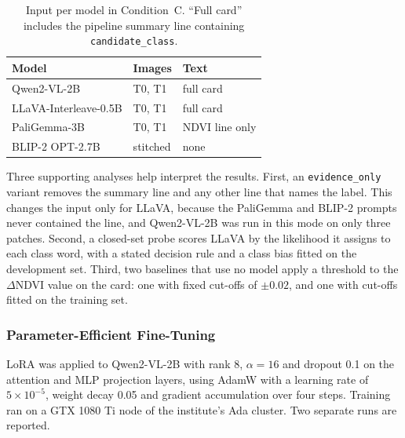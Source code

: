 \begin{table}[t]
\centering
\small
\begin{tabular}{lll}
\toprule
Model & Images & Text \\
\midrule
Qwen2-VL-2B & T0, T1 & full card \\
LLaVA-Interleave-0.5B & T0, T1 & full card \\
PaliGemma-3B & T0, T1 & NDVI line only \\
BLIP-2 OPT-2.7B & stitched & none \\
\bottomrule
\end{tabular}
\caption{Input per model in Condition~C. ``Full card'' includes the
pipeline summary line containing \texttt{candidate\_class}.}
\label{tab:inputs}
\end{table}

Three supporting analyses help interpret the results. First, an
\texttt{evidence\_only} variant removes the summary line and any other
line that names the label. This changes the input only for LLaVA,
because the PaliGemma and BLIP-2 prompts never contained the line, and
Qwen2-VL-2B was run in this mode on only three patches. Second, a
closed-set probe scores LLaVA by the likelihood it assigns to each class
word, with a stated decision rule and a class bias fitted on the
development set. Third, two baselines that use no model apply a
threshold to the $\Delta$NDVI value on the card: one with fixed cut-offs
of $\pm 0.02$, and one with cut-offs fitted on the training set.

\subsubsection{Parameter-Efficient Fine-Tuning}

LoRA  was applied to Qwen2-VL-2B with rank 8,
$\alpha = 16$ and dropout 0.1 on the attention and MLP projection
layers, using AdamW  with a learning rate of
$5 \times 10^{-5}$, weight decay 0.05 and gradient accumulation over
four steps. Training ran on a GTX 1080 Ti node of the institute's Ada
cluster. Two separate runs are reported.
